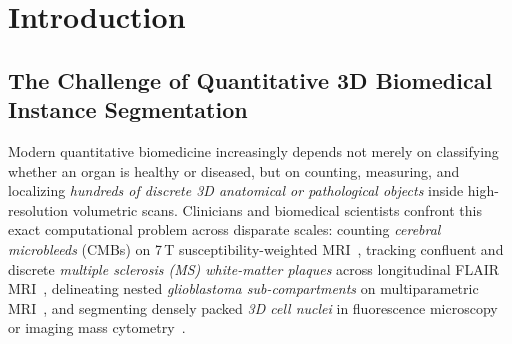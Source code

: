 \documentclass[10pt,a4paper]{article}
\renewcommand{\_}{\origunderscore\allowbreak}
\begin{document}
\clearpage
\section{Introduction}
\label{sec:intro}

\subsection{The Challenge of Quantitative 3D Biomedical Instance Segmentation}

Modern quantitative biomedicine increasingly depends not merely on classifying whether an organ is healthy or diseased, but on counting, measuring, and localizing \emph{hundreds of discrete 3D anatomical or pathological objects} inside high-resolution volumetric scans. Clinicians and biomedical scientists confront this exact computational problem across disparate scales: counting \emph{cerebral microbleeds} (CMBs) on 7\,T susceptibility-weighted MRI~\cite{greenberg2009cmb}, tracking confluent and discrete \emph{multiple sclerosis (MS) white-matter plaques} across longitudinal FLAIR MRI~\cite{thompson2018mcdonald}, delineating nested \emph{glioblastoma sub-compartments} on multiparametric MRI~\cite{menze2015brats}, and segmenting densely packed \emph{3D cell nuclei} in fluorescence microscopy or imaging mass cytometry~\cite{weigert2020stardist3d,stringer2021cellpose}.
\end{document}
